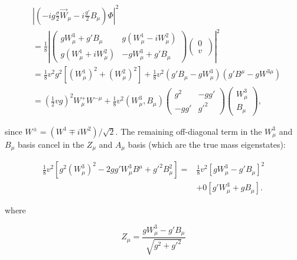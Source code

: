\begin{equation}
\begin{split}
& \left|\left(-ig\frac{\sigma}{2}\vec{W}_\mu - i\frac{g'}{2}B_\mu \right)\Phi\right|^2 \\
&= \frac{1}{8} \left|\left(
    \begin{matrix}
    gW_\mu^3 + g'B_\mu & g(W_\mu^1 - iW_\mu^2) \\
    g(W_\mu^1 + iW_\mu^2) & -gW_\mu^3 + g'B_\mu 
    \end{matrix}
    \right)
    \left(
    \begin{matrix}
    0 \\%
    v   \
    \end{matrix}
    \right) \right|^2 \\
&= \frac{1}{8} v^2 g^2 \left[(W_\mu^1)^2 + (W_\mu^2)^2\right] + \frac{1}{8} v^2 (g'B_\mu - gW_\mu^3)(g'B^\mu - gW^{3\mu}) \\
&= \left(\frac{1}{2}vg\right)^2 W_\mu^{+} W^{-\mu} + \frac{1}{8} v^2 \left(W_\mu^3, B_\mu\right) 
    \left(
    \begin{matrix}
    g^2 & -gg' \\
    -gg' & g'^2
    \end{matrix}
    \right)
    \left(
    \begin{matrix}
    W_\mu^3 \\
    B_\mu
    \end{matrix}
    \right),
\end{split}
\label{eq:HiggsBosonMassDemonstration}
\end{equation}
        
\noindent since $W^{\pm} = (W^1 \mp iW^2)/\sqrt{2}$.
The remaining off-diagonal term in the $W_\mu^3$ and $B_\mu$ basis cancel in the $Z_\mu$ and $A_\mu$ basis (which are the true mass eigenstates):

\begin{equation}
\begin{split}
\frac{1}{8}v^2\left[g^2\left(W_\mu^3\right)^2 - 2gg'W_\mu^3 B^\mu + g'^2B_\mu^2\right] = & \frac{1}{8}v^2\left[ gW_\mu^3 - g'B_\mu\right]^2 \\
& + 0 \left[g'W_\mu^3 + gB_\mu\right].
\end{split}
\label{eq:HiggsBosonMassDemonstration2}
\end{equation}

\noindent where 

\begin{equation}
Z_\mu = \frac{gW_\mu^3 - g'B_\mu}{\sqrt{g^2 + g'^2}}
\label{eq:HiggsZdefinition}
\end{equation}


